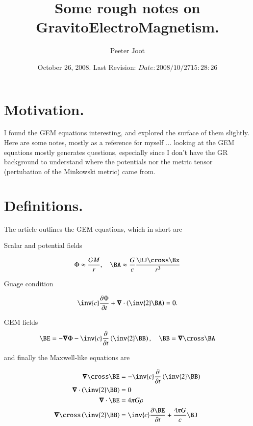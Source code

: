 \documentclass{article}
\title{ Some rough notes on GravitoElectroMagnetism. }
\author{Peeter Joot}
\date{ October 26, 2008.  Last Revision: $Date: 2008/10/27 15:28:26 $ }
\begin{document}
\maketitle{}
\tableofcontents

\section{ Motivation. }

I found the GEM equations interesting, and explored the surface of them slightly.  Here are some notes, mostly as a reference for myself ... looking at the
GEM equations mostly generates questions, especially since I don't have the GR
background to understand where the potentials nor the metric tensor
(pertubation of the Minkowski metric) came from.

\section{ Definitions. }

The article \cite{mashhoon2003gbr} outlines the GEM equations, which in short
are

Scalar and potential fields

\begin{align}
\Phi \approx \frac{GM}{r}, \quad \BA \approx \frac{G}{c} \frac{\BJ \cross \Bx}{r^3}
\end{align}

Guage condition

\begin{align}
\inv{c}\PD{t}{\Phi} + \spacegrad \cdot \left( \inv{2} \BA \right) = 0.
\end{align}

GEM fields
\begin{align}
\BE = - \spacegrad \Phi -\inv{c} \PD{t}{}\left( \inv{2} \BB \right), \quad \BB = \spacegrad \cross \BA
\end{align}

and finally the Maxwell-like equations are

\begin{align}
\spacegrad \cross \BE &= -\inv{c} \PD{t}{}\left(\inv{2}\BB\right) \\
\spacegrad \cdot \left( \inv{2} \BB \right) &= 0 \\
\spacegrad \cdot \BE &= 4 \pi G \rho \\
\spacegrad \cross \left( \inv{2} \BB \right) &= \inv{c} \PD{t}{\BE} + \frac{4\pi G}{c}\BJ
\end{align}
\end{document}
